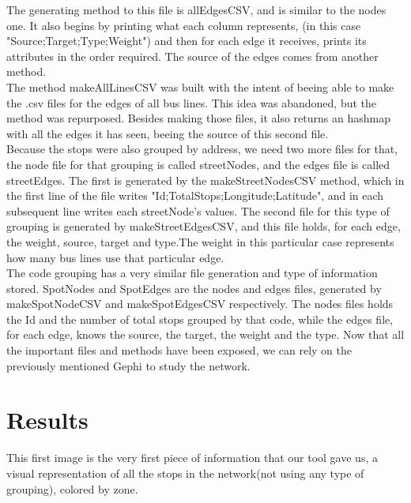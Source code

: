 \documentclass[12pt]{report}
\begin{document}
	The generating method to this file is allEdgesCSV, and is similar to the nodes one.
	It also begins by printing what each column represents, (in this case "Source;Target;Type;Weight") and then for each edge it receives, prints its attributes in the order required. The source of the edges comes from another method.\\
	The method makeAllLinesCSV was built with the intent of beeing able to make the .csv files for the edges of all bus lines. This idea was abandoned, but the method was repurposed. Besides making those files, it also returns an hashmap with all the edges it has seen, beeing the source of this second file.\\
	Because the stops were also grouped by address, we need two more files for that, the node file for that grouping is called streetNodes, and the edges file is called streetEdges. The first is generated by the makeStreetNodesCSV method, which in the first line of the file writes "Id;TotalStops;Longitude;Latitude", and in each subsequent line writes each streetNode's values. The second file for this type of grouping  is generated by makeStreetEdgesCSV, and this file holds, for each edge, the weight, source, target and type.The weight in this particular case represents how many bus lines use that particular edge.\\
	The code grouping has a very similar file generation and type of information stored. SpotNodes and SpotEdges are the nodes and edges files, generated by makeSpotNodeCSV and makeSpotEdgesCSV respectively. The nodes files holds the Id and the number of total stops grouped by that code, while the edges file, for each edge, knows the source, the target, the weight and the type.
	Now that all the important files and methods have been exposed, we can rely on the previously mentioned Gephi to study the network.\\
	
\section{Results}
	This first image is the very first piece of information that our tool gave us, a visual representation of all the stops in the network(not using any type of grouping), colored by zone.\\
\end{document}
